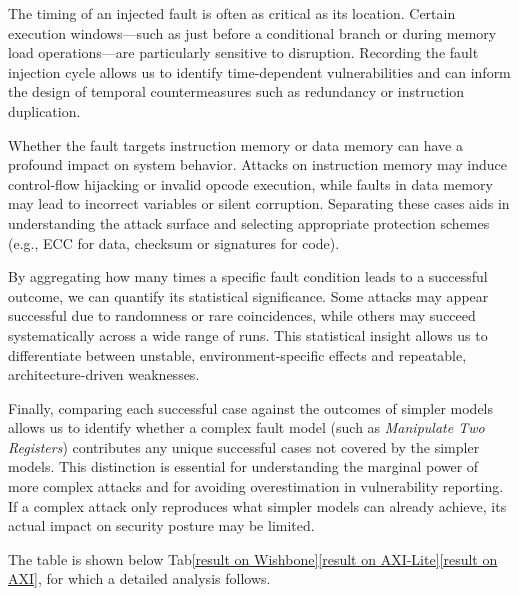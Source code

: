 The timing of an injected fault is often as critical as its location. Certain execution windows—such as just before a conditional branch or during memory load operations—are particularly sensitive to disruption. Recording the fault injection cycle allows us to identify time-dependent vulnerabilities and can inform the design of temporal countermeasures such as redundancy or instruction duplication.

Whether the fault targets instruction memory or data memory can have a profound impact on system behavior. Attacks on instruction memory may induce control-flow hijacking or invalid opcode execution, while faults in data memory may lead to incorrect variables or silent corruption. Separating these cases aids in understanding the attack surface and selecting appropriate protection schemes (e.g., ECC for data, checksum or signatures for code).

By aggregating how many times a specific fault condition leads to a successful outcome, we can quantify its statistical significance. Some attacks may appear successful due to randomness or rare coincidences, while others may succeed systematically across a wide range of runs. This statistical insight allows us to differentiate between unstable, environment-specific effects and repeatable, architecture-driven weaknesses.

Finally, comparing each successful case against the outcomes of simpler models allows us to identify whether a complex fault model (such as \textit{Manipulate Two Registers}) contributes any unique successful cases not covered by the simpler models. This distinction is essential for understanding the marginal power of more complex attacks and for avoiding overestimation in vulnerability reporting. If a complex attack only reproduces what simpler models can already achieve, its actual impact on security posture may be limited.

The table is shown below Tab\ref{result on Wishbone}\ref{result on AXI-Lite}\ref{result on AXI}, for which a detailed analysis follows.

